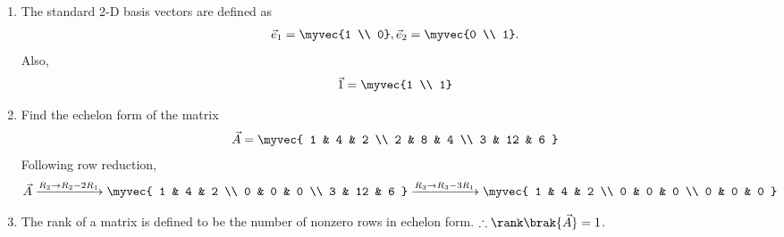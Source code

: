 \begin{enumerate}[label=\thesubsection.\arabic*, ref=\thesubsection.\theenumi]
\begin{align}
			x(t-t_0) \system{F} c_ne^{-\j 2\pi n t_0},
\label{eq:EE26BTECH11202-Fourier-shift-time}
		\end{align}
		\solution 
\begin{align}
 \int_{-\frac{1}{2f_0}}^{\frac{1}{2f_0}} x_0\brak{t-t_0} e^{-\j 2\pi n f_0 t} \, dt 
 &=
 \int_{-\frac{1}{2f_0}}^{\frac{1}{2f_0}} x_0\brak{t} e^{-\j 2\pi n f_0 \brak{t+t_0}} \, dt 
 \\
 &=
e^{\j 2\pi n f_0 t_0} \int_{-\frac{1}{2f_0}}^{\frac{1}{2f_0}} x_0\brak{t} e^{-\j 2\pi n f_0 t} \, dt 
\label{eq:EE26BTECH11202-Fourier-shift-time-1}
\end{align}
after a change of variables.  Note that the limits of integration are unchanged due the periodicity of $x(t)$.
Transferring the exponential term in \eqref{eq:EE26BTECH11202-Fourier-shift-time-1} to the L.H.S yields
\eqref{eq:EE26BTECH11202-Fourier-shift-time}.
	\item The standard 2-D basis vectors are defined as
		\begin{align}
			\vec{e}_1 = \myvec{1 \\ 0},
			\vec{e}_2 = \myvec{0 \\ 1}.
			\label{eq:EE26BTECH11202-2D-basis}
		\end{align}
		Also, 
		\begin{align}
			\vec{1} = \myvec{1 \\ 1}
			\label{eq:EE26BTECH11202-2D-one}
		\end{align}
\item Find the echelon form of the matrix
	\begin{align}
\vec{A} =  \myvec{
1 & 4 & 2 \\
2 & 8 & 4 \\
3 & 12 & 6
}
\end{align}
\solution
Following row reduction, 
\begin{align}
\vec{A} \xrightarrow{R_2 \to R_2 - 2R_1} \myvec{
1 & 4 & 2 \\
0 & 0 & 0 \\
3 & 12 & 6
}
\xrightarrow{R_3 \to R_3 - 3R_1} \myvec{
1 & 4 & 2 \\
0 & 0 & 0 \\
0 & 0 & 0
}
	\label{eq:EE26BTECH11202-echelon-def}
\end{align}
\item The rank of a matrix is defined to be the number of nonzero rows in echelon form.
$\therefore \rank\brak{\vec{A}} = 1$.

\end{enumerate}

